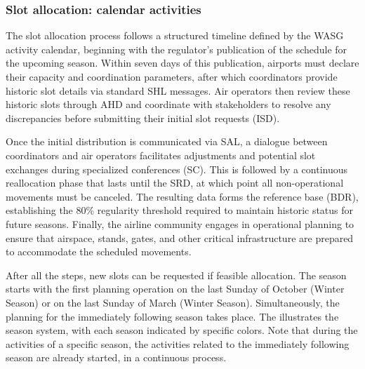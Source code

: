 \subsubsection{Slot allocation: calendar activities}



The slot allocation process follows a structured timeline defined by the
\acrshort{WASG} activity calendar, beginning with the regulator's publication of
the schedule for the upcoming season.
%
Within seven days of this publication, airports must declare their capacity and
coordination parameters, after which coordinators provide historic slot details
via standard \acrfull{SHL} messages.
%
Air operators then review these historic slots through \acrfull{AHD} and
coordinate with stakeholders to resolve any discrepancies before submitting
their initial slot requests (\acrfull{ISD}).



Once the initial distribution is communicated via \acrfull{SAL}, a dialogue
between coordinators and air operators facilitates adjustments and potential
slot exchanges during specialized conferences (\acrfull{SC}).
%
This is followed by a continuous reallocation phase that lasts until the
\acrfull{SRD}, at which point all non-operational movements must be
canceled.
%
The resulting data forms the reference base (\acrfull{BDR}), establishing the
80\% regularity threshold required to maintain historic status for future
seasons.
%
Finally, the airline community engages in operational planning to ensure that
airspace, stands, gates, and other critical infrastructure are prepared to
accommodate the scheduled movements.



After all the steps, new slots can be requested if feasible allocation.
%
The season starts with the first planning operation on the last Sunday of
October (Winter Season) or on the last Sunday of March (Winter Season).
%
Simultaneously, the planning for the immediately following season takes place.
%
The  illustrates the season system, with each season indicated
by specific colors.
%
Note that during the activities of a specific season, the activities related to
the immediately following season are already started, in a continuous process.



%



